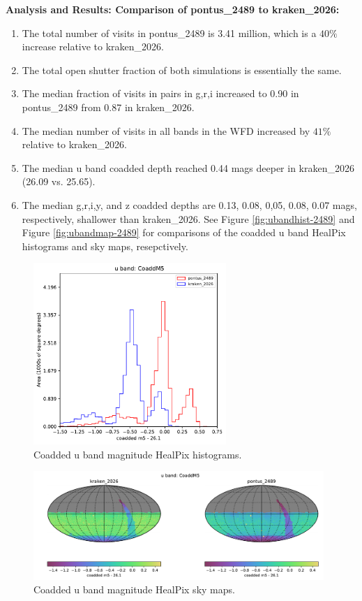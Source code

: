 \documentclass[DM,authoryear,toc]{lsstdoc}
\begin{document}
\textbf{Analysis and Results: Comparison of pontus\_2489 to kraken\_2026:}

\begin{enumerate}
\item The total number of visits in pontus\_2489 is 3.41 million, which is a $40\%$ increase relative to kraken\_2026.
\item The total open shutter fraction of both simulations is essentially the same.
\item The median fraction of visits in pairs in g,r,i increased to 0.90 in pontus\_2489 from 0.87 in kraken\_2026.
\item The median number of visits in all bands in the WFD increased by $41\%$ relative to kraken\_2026.
\item The median u band coadded depth reached 0.44 mags deeper in kraken\_2026 (26.09 vs. 25.65).
\item  The median g,r,i,y, and z coadded depths are 0.13, 0.08, 0,05, 0.08, 0.07 mags, respectively, shallower than kraken\_2026.
See Figure  \autoref{fig:ubandhist-2489} and Figure  \autoref{fig:ubandmap-2489} for comparisons of the coadded u band
HealPix histograms and sky maps, resepctively.
\end{enumerate}

\begin{figure}[ht]
\centering
\includegraphics[width=0.65\textwidth]{figures/pontus_2489_kraken_2026_CoaddM5_u_band_HEAL_ComboHistogram.pdf}
\caption{Coadded u band magnitude HealPix histograms.}
\label{fig:ubandhist-2489}
\end{figure}

\begin{figure}[ht]
\centering
\includegraphics[width=0.98\textwidth]{figures/pontus_2489_kraken_2026_CoaddM5_u_band_HEAL_ComboSkyMap.pdf}
\caption{Coadded u band magnitude HealPix sky maps.}
\label{fig:ubandmap-2489}
\end{figure}
\end{document}
